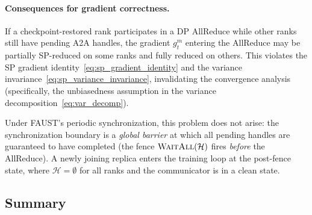 \documentclass{article}
\begin{document}
\paragraph{Consequences for gradient correctness.}
If a checkpoint-restored rank participates in a DP AllReduce while other
ranks still have pending A2A handles, the gradient $g_t^m$ entering
the AllReduce may be partially SP-reduced on some ranks and fully
reduced on others. This violates the SP gradient
identity~\eqref{eq:sp_gradient_identity} and the variance
invariance~\eqref{eq:sp_variance_invariance}, invalidating the
convergence analysis (specifically, the unbiasedness assumption in
the variance decomposition~\eqref{eq:var_decomp}).

Under FAUST's periodic synchronization, this problem does not arise:
the synchronization boundary is a \emph{global barrier} at which all
pending handles are guaranteed to have completed (the fence
$\textsc{WaitAll}(\mathcal{H})$ fires \emph{before} the AllReduce).
A newly joining replica enters the training loop at the post-fence state,
where $\mathcal{H} = \emptyset$ for all ranks and the communicator is in
a clean state.

\subsection{Summary}
\label{sec:checkpoint_summary}

\begin{center}
\end{center}
\end{document}
